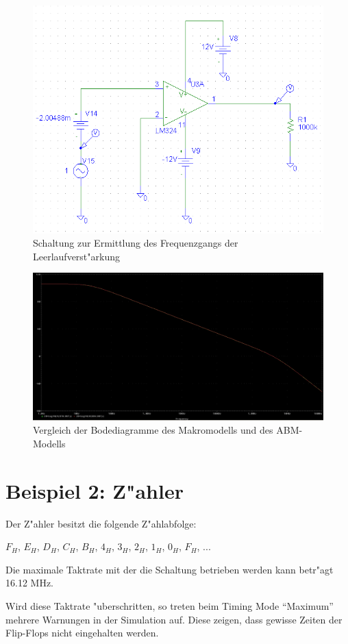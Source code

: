 \begin{figure}%
	\centering
	\includegraphics[width=\textwidth]{fig/1_schaltung.png}
	\caption{Schaltung zur Ermittlung des Frequenzgangs der Leerlaufverst"arkung}
	\label{fig:1_schaltung}
\end{figure}

\begin{figure}%
	\centering
	\includegraphics[width=\textwidth]{fig/1_bode.png}
	\caption{Vergleich der Bodediagramme des Makromodells und des ABM-Modells}
	\label{fig:1_bode}
\end{figure}




\section{Beispiel 2: Z"ahler}

Der Z"ahler besitzt die folgende Z"ahlabfolge:

$F_H$, $E_H$, $D_H$, $C_H$, $B_H$, $4_H$, $3_H$, $2_H$, $1_H$, $0_H$, $F_H$, ...

Die maximale Taktrate mit der die Schaltung betrieben werden kann betr"agt 16.12 MHz.

Wird diese Taktrate "uberschritten, so treten beim Timing Mode ``Maximum'' mehrere Warnungen in der Simulation auf.
Diese zeigen, dass gewisse Zeiten der Flip-Flops nicht eingehalten werden.
